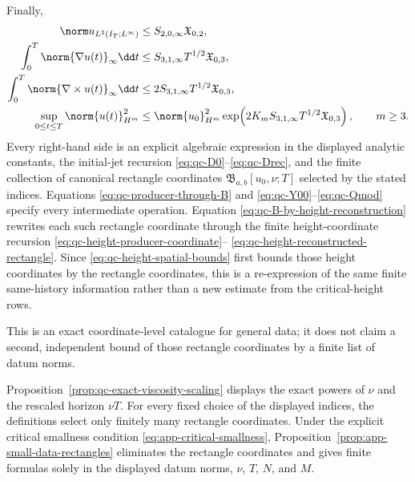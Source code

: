 {\begin{theorem}
Finally,
\begin{align}
 \norm u_{L^2(I_T;L^\infty)}
 &\le S_{2,0,\infty}\mathfrak X_{0,2},
 \label{eq:qc-sharp-L2Linfty}\\
 \int_0^T\norm{\nabla u(t)}_\infty\dd t
 &\le S_{3,1,\infty}T^{1/2}\mathfrak X_{0,3},
 \label{eq:qc-sharp-lipschitz-action}\\
 \int_0^T\norm{\nabla\times u(t)}_\infty\dd t
 &\le2S_{3,1,\infty}T^{1/2}\mathfrak X_{0,3},
 \label{eq:qc-sharp-vorticity-action}\\
 \sup_{0\le t\le T}\norm{u(t)}_{H^m}^2
 &\le\norm{u_0}_{H^m}^2
 \exp\!\left(
 2K_mS_{3,1,\infty}T^{1/2}\mathfrak X_{0,3}
 \right),
 \qquad m\ge3.
 \label{eq:qc-sharp-continuation-growth}
\end{align}
Every right-hand side is an explicit algebraic expression in the displayed
analytic constants, the initial-jet recursion
\eqref{eq:qc-D0}--\eqref{eq:qc-Drec}, and the finite collection of canonical
rectangle coordinates \(\mathfrak B_{a,b}[u_0,\nu;T]\) selected by the stated
indices.  Equations \eqref{eq:qc-producer-through-B} and
\eqref{eq:qc-Y00}--\eqref{eq:qc-Qmod} specify every intermediate operation.
Equation \eqref{eq:qc-B-by-height-reconstruction} rewrites each such rectangle
coordinate through the finite height-coordinate recursion
\eqref{eq:qc-height-producer-coordinate}--%
\eqref{eq:qc-height-reconstructed-rectangle}.  Since
\eqref{eq:qc-height-spatial-bounds} first bounds those height coordinates by
the rectangle coordinates, this is a re-expression of the same finite
same-history information rather than a new estimate from the critical-height
rows.
\begin{samepage}
This is an exact coordinate-level
catalogue for general data; it does not claim a second, independent bound of
those rectangle coordinates by a finite list of datum norms.\par
\end{samepage}
Proposition~\ref{prop:qc-exact-viscosity-scaling} displays the exact powers of
\(\nu\) and the rescaled horizon \(\nu T\).  For every fixed choice of the
displayed indices, the definitions select only finitely many rectangle
coordinates.
Under the explicit critical smallness condition
\eqref{eq:app-critical-smallness}, Proposition~\ref{prop:app-small-data-rectangles}
eliminates the rectangle coordinates and gives finite formulas solely in the
displayed datum norms, \(\nu\), \(T\), \(N\), and \(M\).
\end{theorem}

}
